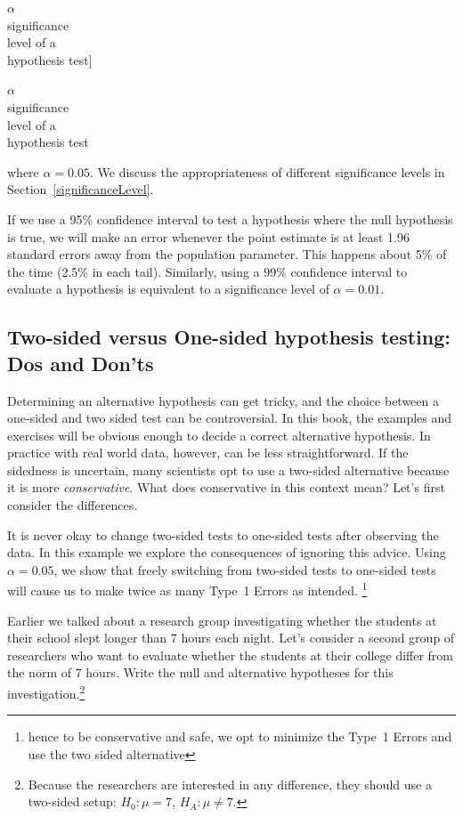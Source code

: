 $\alpha$\\\footnotesize significance\\level of a\\hypothesis test]{\raggedright\vspace{-4mm}

$\alpha$\\\footnotesize significance\\level of a\\hypothesis test} where $\alpha = 0.05$. We discuss the appropriateness of different significance levels in Section~\ref{significanceLevel}.

If we use a 95\% confidence interval to test a hypothesis where the null hypothesis is true, we will make an error whenever the point estimate is at least 1.96 standard errors away from the population parameter. This happens about 5\% of the time (2.5\% in each tail). Similarly, using a 99\% confidence interval to evaluate a hypothesis is equivalent to a significance level of $\alpha = 0.01$.

\subsection{Two-sided versus One-sided hypothesis testing: Dos and Don'ts}
\label{twoSidedTestsWithPValues}


Determining an alternative hypothesis can get tricky, and the choice between a one-sided and two sided test can be controversial. In this book, the examples and exercises will be obvious enough to decide a correct alternative hypothesis. In practice with real world data, however, can be less straightforward. If the sidedness is uncertain, many scientists opt to use a two-sided alternative because it is more \emph{conservative}. What does conservative in this context mean? Let's first consider the differences.

It is never okay to change two-sided tests to one-sided tests after observing the data. In this example we explore the consequences of ignoring this advice. Using $\alpha=0.05$, we show that freely switching from two-sided tests to one-sided tests will cause us to make twice as many Type~1 Errors as intended. \footnote{hence to be conservative and safe, we opt to minimize the Type~1 Errors and use the two sided alternative}\label{swappingHypAfterDataDoublesType1ErrorRate}


\begin{exercise} \label{2ndSchSleepHypSetupExercise}
Earlier we talked about a research group investigating whether the students at their school slept longer than 7 hours each night. Let's consider a second group of researchers who want to evaluate whether the students at their college differ from the norm of 7 hours. Write the null and alternative hypotheses for this investigation.\footnote{Because the researchers are interested in any difference, they should use a two-sided setup: $H_0: \mu = 7$, $H_A: \mu \neq 7$.}
\end{exercise}

